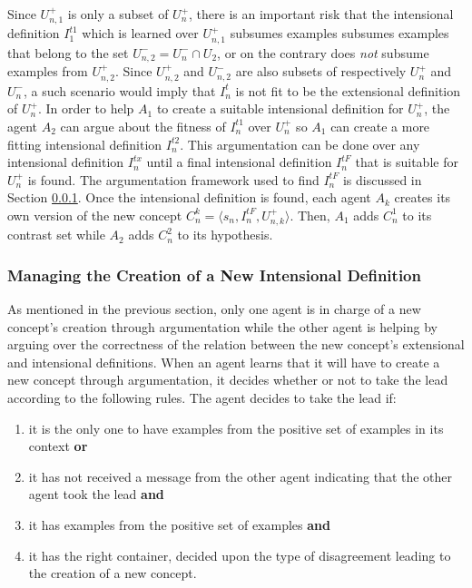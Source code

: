 Since $U^{+}_{n,1}$ is only a subset of $U^{+}_{n}$, there is an important risk that the intensional definition $I^{t1}_{1}$ which is
learned over $U^{+}_{n,1}$ subsumes examples subsumes examples that belong to the set $U^{-}_{n,2} = U^{-}_{n} \cap U_{2}$, or on the contrary does \emph{not} subsume examples from $U^{+}_{n,2}$. Since $U^{+}_{n,2}$ and $U^{-}_{n,2}$ are also subsets of respectively $U^{+}_{n}$ and $U^{-}_{n}$, a such scenario would imply that $I^{t}_{n}$ is not fit to be the extensional definition of $U^{+}_{n}$. In order to help $A_{1}$ to create a suitable intensional definition for $U^{+}_{n}$, the agent $A_{2}$ can argue about the fitness of $I^{t1}_{n}$ over $U^{+}_{n}$ so $A_{1}$ can create a more fitting intensional definition $I^{t2}_{n}$. This argumentation can be done over any intensional definition $I^{tx}_{n}$ until a final intensional definition $I^{tF}_{n}$ that is suitable for $U^{+}_{n}$ is found. The argumentation framework used to find $I^{tF}_{n}$ is discussed in Section \ref{sec:funLeadArg}.
Once the intensional definition is found, each agent $A_{k}$ creates its own version of the new concept $C^{k}_{n} = \langle s_{n}, I^{tF}_{n}, U^{+}_{n,k} \rangle$. Then, $A_{1}$ adds $C^{1}_{n}$ to its contrast set while $A_{2}$ adds $C^{2}_{n}$ to its hypothesis.

\subsubsection{Managing the Creation of a New Intensional Definition}
\label{sec:funLeadArg}

As mentioned in the previous section, only one agent is in charge of a new concept's creation through argumentation while the other agent is helping by arguing over the correctness of the relation between the new concept's extensional and intensional definitions. When an agent learns that it will have to create a new concept through argumentation, it decides whether or not to take the lead according to the following rules. The agent decides to take the lead if:

\begin{enumerate}
    \item it is the only one to have examples from the positive set of examples in its context \textbf{or}
    \item it has not received a message from the other agent indicating that the other agent took the lead \textbf{and}
    \item it has examples from the positive set of examples \textbf{and}
    \item it has the right container, decided upon the type of disagreement leading to the creation of a new concept.
\end{enumerate}

